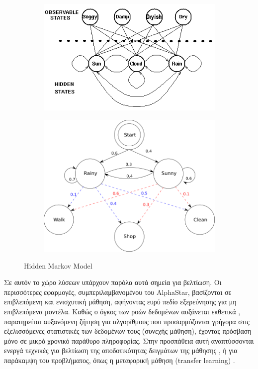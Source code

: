 	\begin{figure}
		\centering
		\begin{subfigure}[t]{0.52\textwidth}
			\includegraphics[width=\textwidth]{figures/hmm}
		\end{subfigure}
		\hfill
		\begin{subfigure}[t]{0.47\textwidth}
			\includegraphics[width=\textwidth]{figures/hmm2}
		\end{subfigure}
		\caption{Hidden Markov Model}
		\label{fig:HMM}
	\end{figure}

	Σε αυτόν το χώρο λύσεων υπάρχουν παρόλα αυτά σημεία για βελτίωση.
	Οι περισσότερες εφαρμογές, συμπεριλαμβανομένου του AlphaStar, βασίζονται σε επιβλεπόμενη και ενισχυτική μάθηση,
	αφήνοντας ευρύ πεδίο εξερεύνησης για μη επιβλεπόμενα μοντέλα.
	Καθώς ο όγκος των ροών δεδομένων αυξάνεται εκθετικά \parencite{losingIncrementalOnlineLearning2018},
	παρατηρείται αυξανόμενη ζήτηση για αλγορίθμους που προσαρμόζονται γρήγορα στις εξελισσόμενες στατιστικές των δεδομένων τους (συνεχής μάθηση),
	έχοντας πρόσβαση μόνο σε μικρό χρονικό παράθυρο πληροφορίας.
	Στην προσπάθεια αυτή αναπτύσσονται ενεργά τεχνικές για βελτίωση της αποδοτικότητας δειγμάτων της μάθησης \parencite[όπως][]{nachumDataEfficientHierarchicalReinforcement2018},
	ή για παράκαμψη του προβλήματος, όπως η μεταφορική μάθηση (transfer learning) \parencite{xiongApplicationTransferLearning2018}.
	\medskip

